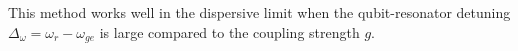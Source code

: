 \documentclass[12pt, twoside]{report}
\renewcommand*\thesection{\arabic{section}}
\numberwithin{equation}{section}
\renewcommand*\thesection{\arabic{chapter}.\arabic{section}}
\begin{document}
This method works well in the dispersive limit when the qubit-resonator detuning $\Delta_\omega = \omega_r - \omega_{ge}$ is large compared to the coupling strength $g$.

%

\appendix
\renewcommand*\thesection{\Alph{chapter}.\arabic{section}}

%

%




\end{document}
